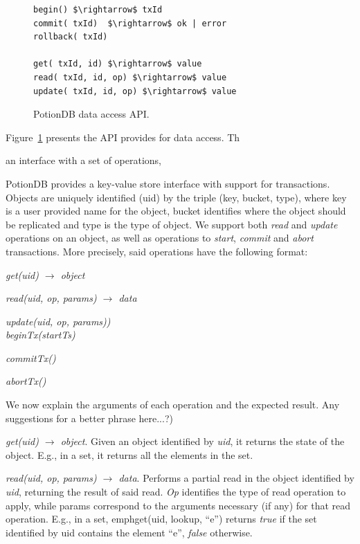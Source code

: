 \documentclass{vldb}
\newcommand{\grumbler}[2]{{\color{red}{\bf #1:} #2}}
\renewcommand{\grumbler}[2]{}
\newcommand{\andre}[1]{\grumbler{andre}{#1}}
\newcommand{\emphvspace}{0.5\baselineskip}
\newcommand{\firstblockemph}[1]{\vspace{\emphvspace}\hspace{2em}\emph{#1}}
\newcommand{\middleblockemph}[1]{\hspace{2em}\emph{#1}}
\newcommand{\lastblockemph}[1]{\hspace{2em}\emph{#1}\vspace{\emphvspace}}
\begin{document}
\begin{figure}[h]
\begin{lstlisting}
begin() $\rightarrow$ txId
commit( txId)  $\rightarrow$ ok | error
rollback( txId)

get( txId, id) $\rightarrow$ value
read( txId, id, op) $\rightarrow$ value
update( txId, id, op) $\rightarrow$ value
\end{lstlisting}

\caption{PotionDB data access API.}\label{fig:dataapi}
\end{figure}

Figure~\ref{fig:dataapi} presents the API provides for data access. Th




an interface with a set of operations, 








\andre{I repeated the uid explanation from Database Model and API to here... where should it stay?}

PotionDB provides a key-value store interface with support for transactions.
Objects are uniquely identified (uid) by the triple (key, bucket, type), where key is a user provided name for the object, bucket identifies where the object should be replicated and type is the type of object.
We support both \emph{read} and \emph{update} operations on an object, as well as operations to \emph{start}, \emph{commit} and \emph{abort} transactions.
More precisely, said operations have the following format:

\firstblockemph{get(uid) $\rightarrow$ object}

\middleblockemph{read(uid, op, params) $\rightarrow$ data}

\middleblockemph{update(uid, op, params))} \\

\middleblockemph{beginTx(startTs)}

\middleblockemph{commitTx()}

\lastblockemph{abortTx()}

We now explain the arguments of each operation and the expected result.
\andre(Any suggestions for a better phrase here...?)

\emph{get(uid) $\rightarrow$ object}. Given an object identified by \emph{uid}, it returns the state of the object.
E.g., in a set, it returns all the elements in the set.

\emph{read(uid, op, params) $\rightarrow$ data}. Performs a partial read in the object identified by \emph{uid}, returning the result of said read. 
\emph{Op} identifies the type of read operation to apply, while params correspond to the arguments necessary (if any) for that read operation.
E.g., in a set, emph{get(uid, lookup, ``e'')} returns \emph{true} if the set identified by uid contains the element ``e'', \emph{false} otherwise.
\end{document}
